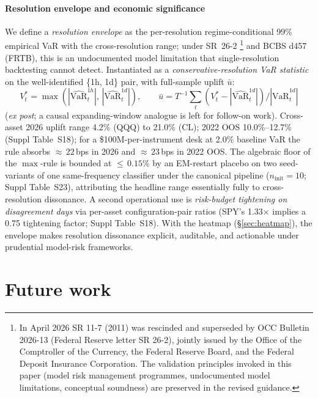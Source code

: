 \documentclass[preprint,12pt,authoryear]{elsarticle}
\begin{document}
\paragraph{Resolution envelope and economic significance}
We define a \emph{resolution envelope} as the per-resolution regime-conditional 99\% empirical VaR with the cross-resolution range; under SR~26-2 \citep{occ_bulletin_2026_13}\footnote{In April 2026 SR 11-7 (2011) was rescinded and superseded by OCC Bulletin 2026-13 (Federal Reserve letter SR 26-2), jointly issued by the Office of the Comptroller of the Currency, the Federal Reserve Board, and the Federal Deposit Insurance Corporation. The validation principles invoked in this paper (model risk management programmes, undocumented model limitations, conceptual soundness) are preserved in the revised guidance.} and BCBS d457 (FRTB), this is an undocumented model limitation that single-resolution backtesting cannot detect. Instantiated as a \emph{conservative-resolution VaR statistic} on the well-identified \{1h, 1d\} pair, with full-sample uplift $\bar{u}$:
\begin{equation*}
V^{*}_t = \max(|\widehat{\text{VaR}}^{1h}_t|,\, |\widehat{\text{VaR}}^{1d}_t|), \qquad
\bar{u} = T^{-1} \sum_t (V^{*}_t - |\widehat{\text{VaR}}^{1d}_t|) / |\widehat{\text{VaR}}^{1d}_t|
\end{equation*}
(\emph{ex post}; a causal expanding-window analogue is left for follow-on work). Cross-asset 2026 uplift range 4.2\% (QQQ) to 21.0\% (CL); 2022 OOS 10.0\%--12.7\% (Suppl Table~S18); for a \$100M-per-instrument desk at 2.0\% baseline VaR the rule absorbs ${\approx}\,22$\,bps in 2026 and ${\approx}\,23$\,bps in 2022 OOS. The algebraic floor of the $\max$-rule is bounded at ${\le}\,0.15\%$ by an EM-restart placebo on two seed-variants of one same-frequency classifier under the canonical pipeline ($n_{\text{init}}=10$; Suppl Table~S23), attributing the headline range essentially fully to cross-resolution dissonance. A second operational use is \emph{risk-budget tightening on disagreement days} via per-asset configuration-pair ratios (SPY's 1.33$\times$ implies a 0.75 tightening factor; Suppl Table~S18). With the heatmap (\S\ref{sec:heatmap}), the envelope makes resolution dissonance explicit, auditable, and actionable under prudential model-risk frameworks.

\section{Future work}
\label{sec:future_work}
\end{document}
